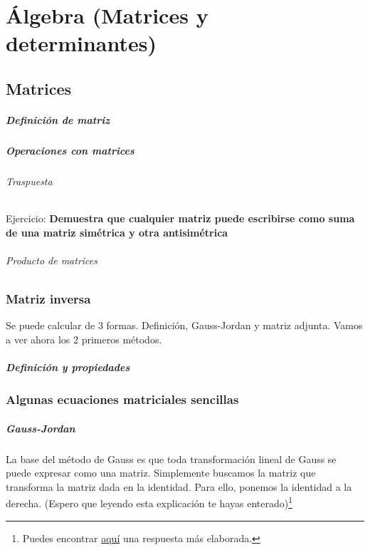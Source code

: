 \chapter{Álgebra (Matrices y determinantes)}

\section{Matrices}

\paragraph{Definición de matriz}

\paragraph{Operaciones con matrices}

\subparagraph{Traspuesta}

Ejercicio: \textbf{Demuestra que cualquier matriz puede escribirse como suma de una matriz simétrica y otra antisimétrica}

\subparagraph{Producto de matrices}

\subsection{Matriz inversa}
Se puede calcular de 3 formas. Definición, Gauss-Jordan y matriz adjunta. Vamos a ver ahora los 2 primeros métodos.

\paragraph{Definición y propiedades}

\subsection{Algunas ecuaciones matriciales sencillas}

\paragraph{Gauss-Jordan}
La base del método de Gauss es que toda transformación lineal de Gauss se puede expresar como una matriz. Simplemente buscamos la matriz que transforma la matriz dada en la identidad. Para ello, ponemos la identidad a la derecha. (Espero que leyendo esta explicación te hayas enterado)\footnote{Puedes encontrar \href{https://math.stackexchange.com/questions/1240055/why-does-the-gaussian-jordan-elimination-works-when-finding-the-inverse-matrix}{aquí} una respuesta más elaborada.}

